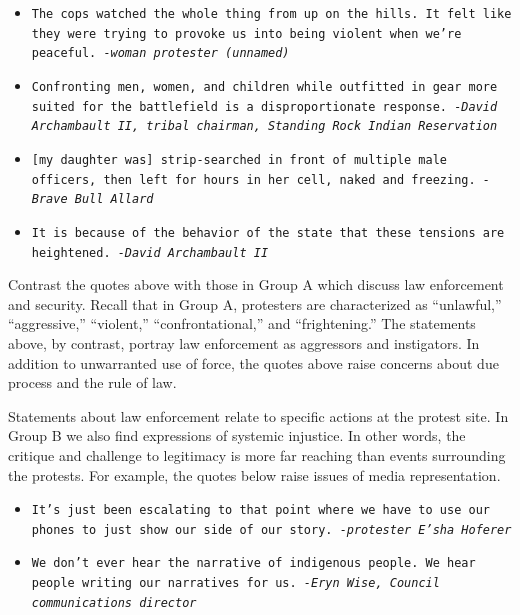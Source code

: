 \begin{footnotesize}
\begin{itemize}
\item[] \texttt{The cops watched the whole thing from up on the hills. It felt like they were trying to provoke us into being violent when we're peaceful.\newline 
\textit{-woman protester (unnamed)}}
\newline
\item[] \texttt{Confronting men, women, and children while outfitted in gear more suited for the battlefield is a disproportionate response. \newline   
\textit{-David Archambault II,  tribal chairman, Standing Rock Indian Reservation }}
\newline
\item[] \texttt{[my daughter was] strip-searched in front of multiple male officers, then left for hours in her cell, naked and freezing.\newline    
\textit{-Brave Bull Allard }}
\newline
\item[] \texttt{It is because of the behavior of the state that these tensions are heightened.\newline    
\textit{-David Archambault II}}
\end{itemize}
\end{footnotesize}

Contrast the quotes above with those in Group A which discuss law enforcement and security. Recall that in Group A, protesters are characterized as ``unlawful,'' ``aggressive,'' ``violent,'' ``confrontational,'' and ``frightening.'' The statements above, by contrast, portray law enforcement as aggressors and instigators. In addition to unwarranted use of force, the quotes above raise concerns about due process and the rule of law. 

Statements about law enforcement relate to specific actions at the protest site. In Group B we also find expressions of systemic injustice. In other words, the critique and challenge to legitimacy is more far reaching than events surrounding the protests. For example, the quotes below raise issues of media representation. 

\begin{footnotesize}
\begin{itemize}
\item[] \texttt{It's just been escalating to that point where we have to use our phones to just show our side of our story. \newline 
\textit{-protester E'sha Hoferer}}
\newline
\item[] \texttt{We don't ever hear the narrative of indigenous people.  We hear people writing our narratives for us.\newline   
\textit{-Eryn Wise, Council communications director}}
\end{itemize}
\end{footnotesize}

